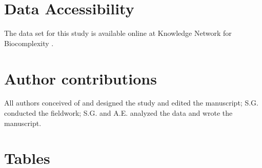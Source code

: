 \documentclass{article}
\begin{document}
\section*{Data Accessibility}
The data set for this study is available online at Knowledge Network for Biocomplexity \citep{gee2017}. 

\section*{Author contributions} All authors conceived of and designed the study and edited the manuscript; S.G. conducted the fieldwork; S.G. and A.E. analyzed the data and wrote the manuscript.



\section* {Tables}
\end{document}
